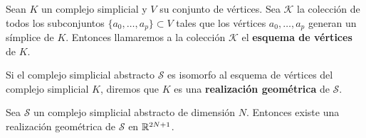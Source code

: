 \begin{definicion}
	Sean $K$ un complejo simplicial y $V$ su conjunto de vértices. Sea
	$\mathcal{K}$ la colección de todos los subconjuntos
	$\{a_{0}, \dots, a_{p}\} \subset V$ tales que los vértices
	$a_{0}, \dots, a_{p}$ generan un símplice de $K$. Entonces llamaremos a la colección
	$\mathcal{K}$ el \textbf{esquema de vértices} de $K$.
\end{definicion}
\begin{definicion}
	Si el complejo simplicial abstracto $\mathcal{S}$ es isomorfo al esquema de vértices
	del complejo simplicial $K$, diremos que $K$ es una \textbf{realización
		geométrica} de $\mathcal{S}$.
\end{definicion}
\begin{proposicion}
	Sea $\mathcal{S}$ un complejo simplicial abstracto de dimensión $N$. Entonces
	existe una realización geométrica de $\mathcal{S}$ en $\mathbb{R}^{2N+1}$.
\end{proposicion}
